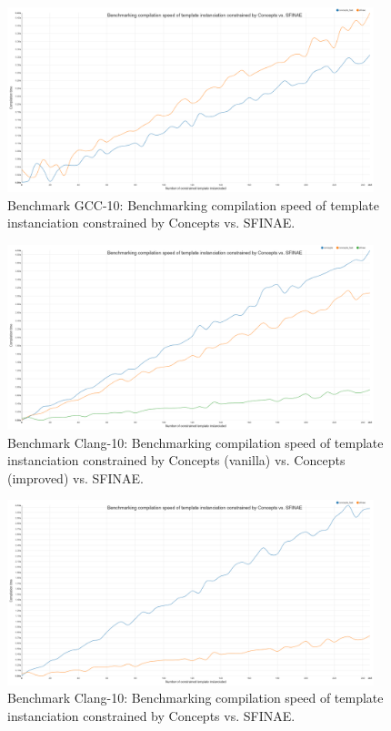 \begin{figure}[htb]
  \centering
  \includegraphics[width=4.2in]{figs/compile_time_benches/gcc10/chart.concept2.png}
  \caption{Benchmark GCC-10: Benchmarking compilation speed of template instanciation constrained by Concepts vs. SFINAE.}
  \label{fig.gen.bench.gcc10.2.concept.sfinae}
\end{figure}

\begin{figure}[htb]
  \centering
  \includegraphics[width=4.2in]{figs/compile_time_benches/clang10/chart.concept.png}
  \caption{Benchmark Clang-10: Benchmarking compilation speed of template instanciation constrained by Concepts (vanilla) vs. Concepts (improved) vs. SFINAE.}
  \label{fig.gen.bench.clang10.1.concept.sfinae}
\end{figure}

\begin{figure}[htb]
  \centering
  \includegraphics[width=4.2in]{figs/compile_time_benches/clang10/chart.concept2.png}
  \caption{Benchmark Clang-10: Benchmarking compilation speed of template instanciation constrained by Concepts vs. SFINAE.}
  \label{fig.gen.bench.clang10.2.concept.sfinae}
\end{figure}

